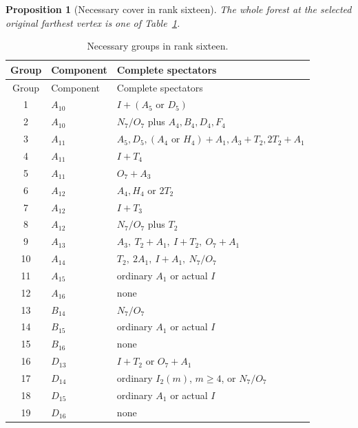 \documentclass[11pt]{article}
\newtheorem{proposition}[theorem]{Proposition}
\begin{document}
\begin{proposition}[Necessary cover in rank sixteen]\label{prop:f16}
The whole forest at the selected original farthest vertex is one of
Table~\ref{tab:f16}.
\end{proposition}
\begin{longtable}{clp{8cm}}
\caption{Necessary groups in rank sixteen.}\label{tab:f16}\\
\toprule Group&Component&Complete spectators\\\midrule\endfirsthead
\toprule Group&Component&Complete spectators\\\midrule\endhead
1&$A_{10}$&$I+(A_5\text{ or }D_5)$\\
2&$A_{10}$&$N_7/O_7$ plus $A_4,B_4,D_4,F_4$\\
3&$A_{11}$&$A_5,D_5,(A_4\text{ or }H_4)+A_1,A_3+T_2,2T_2+A_1$\\
4&$A_{11}$&$I+T_4$\\
5&$A_{11}$&$O_7+A_3$\\
6&$A_{12}$&$A_4,H_4$ or $2T_2$\\
7&$A_{12}$&$I+T_3$\\
8&$A_{12}$&$N_7/O_7$ plus $T_2$\\
9&$A_{13}$&$A_3,\ T_2+A_1,\ I+T_2,\ O_7+A_1$\\
10&$A_{14}$&$T_2,\ 2A_1,\ I+A_1,\ N_7/O_7$\\
11&$A_{15}$&ordinary $A_1$ or actual $I$\\
12&$A_{16}$&none\\
13&$B_{14}$&$N_7/O_7$\\
14&$B_{15}$&ordinary $A_1$ or actual $I$\\
15&$B_{16}$&none\\
16&$D_{13}$&$I+T_2$ or $O_7+A_1$\\
17&$D_{14}$&ordinary $I_2(m)$, $m\ge4$, or $N_7/O_7$\\
18&$D_{15}$&ordinary $A_1$ or actual $I$\\
19&$D_{16}$&none\\\bottomrule
\end{longtable}
\end{document}
